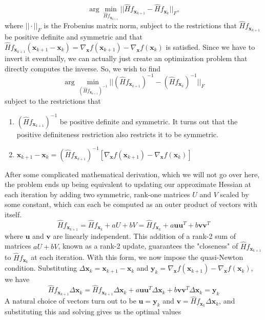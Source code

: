     \[\arg \min_{\hat{H} f_{\mathbf{x}_{k+1}}} ||\hat{H} f_{\mathbf{x}_{k+1}} - \hat{H} f_{\mathbf{x}_{k}}||_F,\]
    where $|| \cdot ||_F$ is the Frobenius matrix norm, subject to the restrictions that $\hat{H} f_{\mathbf{x}_{k+1}}$ be positive definite and symmetric and that $\hat{H} f_{\mathbf{x}_{k+1}} (\mathbf{x}_{k+1} - \mathbf{x}_k) = \nabla_\mathbf{x} f (\mathbf{x}_{k+1}) - \nabla_\mathbf{x} f (\mathbf{x}_k)$ is satisfied. Since we have to invert it eventually, we can actually just create an optimization problem that directly computes the inverse. So, we wish to find 
    \[\arg \min_{(\hat{H} f_{\mathbf{x}_{k+1}})^{-1}} ||(\hat{H} f_{\mathbf{x}_{k+1}})^{-1} - (\hat{H} f_{\mathbf{x}_{k}})^{-1} ||_F\]
    subject to the restrictions that 
    \begin{enumerate}
        \item $(\hat{H} f_{\mathbf{x}_{k+1}})^{-1}$ be positive definite and symmetric. It turns out that the positive definiteness restriction also restricts it to be symmetric. 
        \item $\mathbf{x}_{k+1} - \mathbf{x}_k = (\hat{H} f_{\mathbf{x}_{k+1}})^{-1} [\nabla_\mathbf{x} f (\mathbf{x}_{k+1}) - \nabla_\mathbf{x} f (\mathbf{x}_k)]$
    \end{enumerate}
    After some complicated mathematical derivation, which we will not go over here, the problem ends up being equivalent to updating our approximate Hessian at each iteration by adding two symmetric, rank-one matrices $U$ and $V$ scaled by some constant, which can each be computed as an outer product of vectors with itself. 
    \[\hat{H} f_{\mathbf{x}_{k+1}} = \hat{H} f_{\mathbf{x}_{k}} + a U + b V = \hat{H} f_{\mathbf{x}_{k}} + a \mathbf{u} \mathbf{u}^T + b \mathbf{v} \mathbf{v}^T\]
    where $\mathbf{u}$ and $\mathbf{v}$ are linearly independent. This addition of a rank-2 sum of matrices $a U + b V$, known as a rank-2 update, guarantees the "closeness" of $\hat{H} f_{\mathbf{x}_{k+1}}$ to $\hat{H} f_{\mathbf{x}_{k}}$ at each iteration. With this form, we now impose the quasi-Newton condition. Substituting $\Delta \mathbf{x}_k = \mathbf{x}_{k+1} - \mathbf{x}_k$ and $\mathbf{y}_k = \nabla_\mathbf{x} f (\mathbf{x}_{k+1}) - \nabla_\mathbf{x} f (\mathbf{x}_k)$, we have
    \[\hat{H} f_{\mathbf{x}_{k+1}} \Delta \mathbf{x}_k = \hat{H} f_{\mathbf{x}_{k+1}} \Delta \mathbf{x}_k + a \mathbf{u} \mathbf{u}^T \Delta \mathbf{x}_k + b \mathbf{v} \mathbf{v}^T \Delta \mathbf{x}_k = \mathbf{y}_k\]
    A natural choice of vectors turn out to be $\mathbf{u} = \mathbf{y}_k$ and $\mathbf{v} = \hat{H} f_{\mathbf{x}_{k}} \Delta \mathbf{x}_k$, and substituting this and solving gives us the optimal values 
